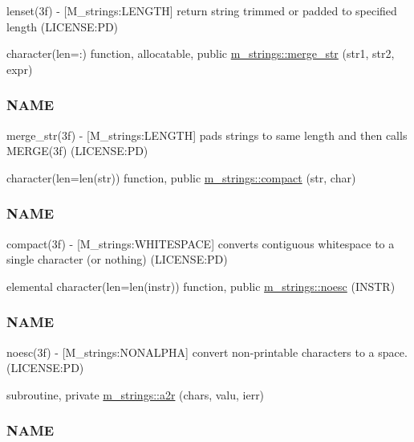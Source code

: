 \begin{DoxyCompactItemize}
\begin{DoxyCompactList}
lenset(3f) -\/ \mbox{[}M\+\_\+strings\+:L\+E\+N\+G\+TH\mbox{]} return string trimmed or padded to specified length (L\+I\+C\+E\+N\+SE\+:PD) \end{DoxyCompactList}\item 
character(len=\+:) function, allocatable, public \mbox{\hyperlink{namespacem__strings_aba5a8d7fc092b38d1939f37a13247c1e}{m\+\_\+strings\+::merge\+\_\+str}} (str1, str2, expr)
\begin{DoxyCompactList}\small\item\em \subsubsection*{N\+A\+ME}

merge\+\_\+str(3f) -\/ \mbox{[}M\+\_\+strings\+:L\+E\+N\+G\+TH\mbox{]} pads strings to same length and then calls M\+E\+R\+G\+E(3f) (L\+I\+C\+E\+N\+SE\+:PD) \end{DoxyCompactList}\item 
character(len=len(str)) function, public \mbox{\hyperlink{namespacem__strings_a929c032267cb990ad4991fab4aed1d57}{m\+\_\+strings\+::compact}} (str, char)
\begin{DoxyCompactList}\small\item\em \subsubsection*{N\+A\+ME}

compact(3f) -\/ \mbox{[}M\+\_\+strings\+:W\+H\+I\+T\+E\+S\+P\+A\+CE\mbox{]} converts contiguous whitespace to a single character (or nothing) (L\+I\+C\+E\+N\+SE\+:PD) \end{DoxyCompactList}\item 
elemental character(len=len(instr)) function, public \mbox{\hyperlink{namespacem__strings_a5d72fde097444c689f1822c5ad95e03d}{m\+\_\+strings\+::noesc}} (I\+N\+S\+TR)
\begin{DoxyCompactList}\small\item\em \subsubsection*{N\+A\+ME}

noesc(3f) -\/ \mbox{[}M\+\_\+strings\+:N\+O\+N\+A\+L\+P\+HA\mbox{]} convert non-\/printable characters to a space. (L\+I\+C\+E\+N\+SE\+:PD) \end{DoxyCompactList}\item 
subroutine, private \mbox{\hyperlink{namespacem__strings_a6b4babf586dc3586426b13e4bb0fb979}{m\+\_\+strings\+::a2r}} (chars, valu, ierr)
\begin{DoxyCompactList}\small\item\em \subsubsection*{N\+A\+ME}


\end{DoxyCompactList}
\end{DoxyCompactItemize}
